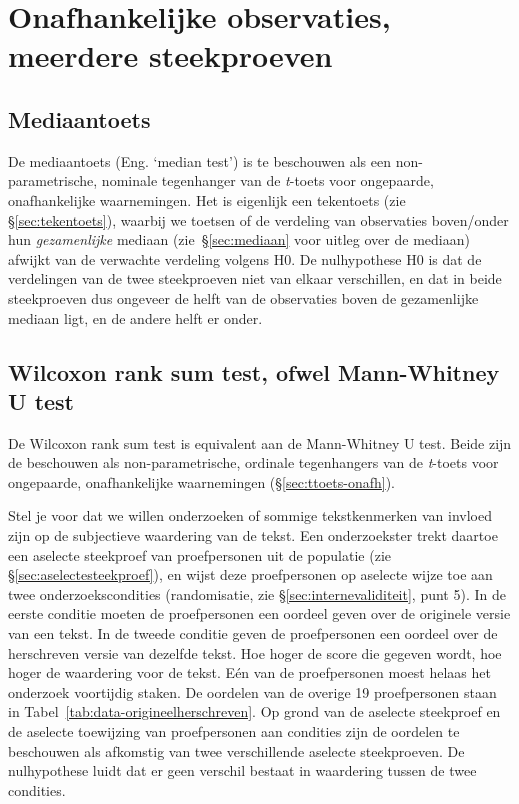 \documentclass[
]{book}
\begin{document}
\hypertarget{onafhankelijke-observaties-meerdere-steekproeven}{%
\section{Onafhankelijke observaties, meerdere steekproeven}\label{onafhankelijke-observaties-meerdere-steekproeven}}

\hypertarget{mediaantoets}{%
\subsection{Mediaantoets}\label{mediaantoets}}

De mediaantoets (Eng. `median test') is te beschouwen als een non-parametrische, nominale
tegenhanger van de \emph{t}-toets voor ongepaarde, onafhankelijke waarnemingen. Het is
eigenlijk een tekentoets (zie §\ref{sec:tekentoets}), waarbij we toetsen of de verdeling van
observaties boven/onder hun \emph{gezamenlijke} mediaan
(zie~§\ref{sec:mediaan} voor uitleg over de mediaan) afwijkt van de verwachte verdeling volgens H0.
De nulhypothese H0 is dat de verdelingen van de twee steekproeven niet
van elkaar verschillen, en dat in beide steekproeven dus ongeveer de
helft van de observaties boven de gezamenlijke mediaan ligt, en de
andere helft er onder.

\hypertarget{sec:wilcoxon-rank-sum}{%
\subsection{Wilcoxon rank sum test, ofwel Mann-Whitney U test}\label{sec:wilcoxon-rank-sum}}

De Wilcoxon rank sum test is equivalent aan de Mann-Whitney U test.
Beide zijn de beschouwen als non-parametrische, ordinale tegenhangers
van de \emph{t}-toets voor ongepaarde, onafhankelijke waarnemingen
(§\ref{sec:ttoets-onafh}).

Stel je voor dat we willen onderzoeken of sommige tekstkenmerken van
invloed zijn op de subjectieve waardering van de tekst. Een
onderzoekster trekt daartoe een aselecte steekproef van proefpersonen
uit de populatie (zie
§\ref{sec:aselectesteekproef}), en wijst deze proefpersonen op
aselecte wijze toe aan twee onderzoekscondities (randomisatie, zie §\ref{sec:internevaliditeit}, punt 5).
In de eerste conditie moeten de proefpersonen een oordeel geven over de
originele versie van een tekst. In de tweede conditie geven de
proefpersonen een oordeel over de herschreven versie van dezelfde tekst.
Hoe hoger de score die gegeven wordt, hoe hoger de waardering voor de
tekst. Eén van de proefpersonen moest helaas het onderzoek voortijdig
staken. De oordelen van de overige 19 proefpersonen staan in
Tabel~\ref{tab:data-origineelherschreven}. Op grond van de aselecte
steekproef en de aselecte toewijzing van proefpersonen aan condities
zijn de oordelen te beschouwen als afkomstig van twee verschillende
aselecte steekproeven. De nulhypothese luidt dat er geen verschil
bestaat in waardering tussen de twee condities.
\end{document}
